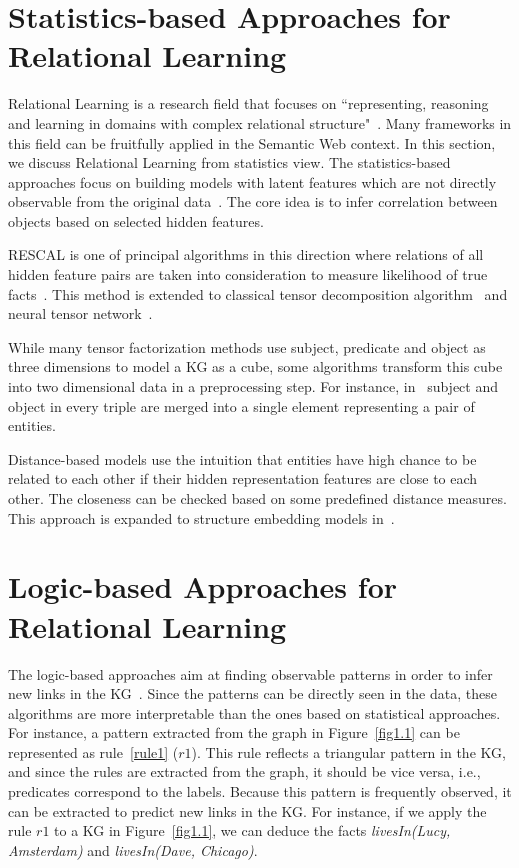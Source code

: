 \section{Statistics-based Approaches for Relational Learning}

Relational Learning is a research field that focuses on ``representing, reasoning and learning in domains with complex relational structure"~\cite{ref43}. Many frameworks in this field can be fruitfully applied in the Semantic Web context. In this section, we discuss Relational Learning from statistics view. The statistics-based approaches focus on building models with latent features which are not directly observable from the original data~\cite{ref1}. The core idea is to infer correlation between objects based on selected hidden features.

RESCAL is one of principal algorithms in this direction where relations of all hidden feature pairs are taken into consideration to measure likelihood of true facts~\cite{ref2, ref3}. This method is extended to classical tensor decomposition algorithm~\cite{ref4} and neural tensor network~\cite{ref5}.

While many tensor factorization methods use subject, predicate and object as three dimensions to model a KG as a cube, some algorithms transform this cube into two dimensional data in a preprocessing step. For instance, in~\cite{ref6, ref7} subject and object in every triple are merged into a single element representing a pair of entities.%

Distance-based models use the intuition that entities have high chance to be related to each other if their hidden representation features are close to each other. The closeness can be checked based on some predefined distance measures. This approach is expanded to structure embedding models in~\cite{ref8}.

\section{Logic-based Approaches for Relational Learning}

The logic-based approaches aim at finding observable patterns in order to infer new links in the KG~\cite{ref1}. Since the patterns can be directly seen in the data, these algorithms are more interpretable than the ones based on statistical approaches. For instance, a pattern extracted from the graph in Figure~\ref{fig1.1} can be represented as rule~\ref{rule1} ($r1$). This rule reflects a triangular pattern in the KG, and since the rules are extracted from the graph, it should be vice versa, i.e., predicates correspond to the labels. Because this pattern is frequently observed, it can be extracted to predict new links in the KG. For instance, if we apply the rule $r1$ to a KG in Figure~\ref{fig1.1}, we can deduce the facts \textit{livesIn(Lucy, Amsterdam)} and \textit{livesIn(Dave, Chicago)}.

